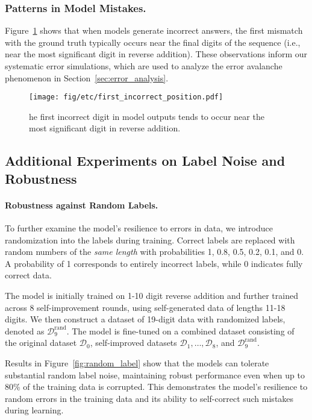 \subsubsection{Patterns in Model Mistakes. } 

Figure~\ref{fig:first_wrong_location} shows that when models generate incorrect answers, the first mismatch with the ground truth typically occurs near the final digits of the sequence (i.e., near the most significant digit in reverse addition). These observations inform our systematic error simulations, which are used to analyze the error avalanche phenomenon in Section~\ref{sec:error_analysis}.

\begin{figure}[ht!]
    \centering
    \texttt{[image: fig/etc/first\_incorrect\_position.pdf]}
    \caption{he first incorrect digit in model outputs tends to occur near the most significant digit in reverse addition.}
    \label{fig:first_wrong_location}
\end{figure}


\subsection{Additional Experiments on Label Noise and Robustness}\label{sec:appdx_label_noise}

\paragraph{Robustness against Random Labels. }
To further examine the model’s resilience to errors in data, we introduce randomization into the labels during training. Correct labels are replaced with random numbers of the \textit{same length} with probabilities 1, 0.8, 0.5, 0.2, 0.1, and 0. A probability of 1 corresponds to entirely incorrect labels, while 0 indicates fully correct data.

The model is initially trained on 1-10 digit reverse addition and further trained across 8 self-improvement rounds, using self-generated data of lengths 11-18 digits. We then construct a dataset of 19-digit data with randomized labels, denoted as $\mathcal{D}^\text{rand}_9$. The model is fine-tuned on a combined dataset consisting of the original dataset $\mathcal{D}_0$, self-improved datasets $\mathcal{D}_1, \dots, \mathcal{D}_8$, and $\mathcal{D}^\text{rand}_9$.

Results in Figure~\ref{fig:random_label} show that the models can tolerate substantial random label noise, maintaining robust performance even when up to 80\% of the training data is corrupted. This demonstrates the model’s resilience to random errors in the training data and its ability to self-correct such mistakes during learning. 


